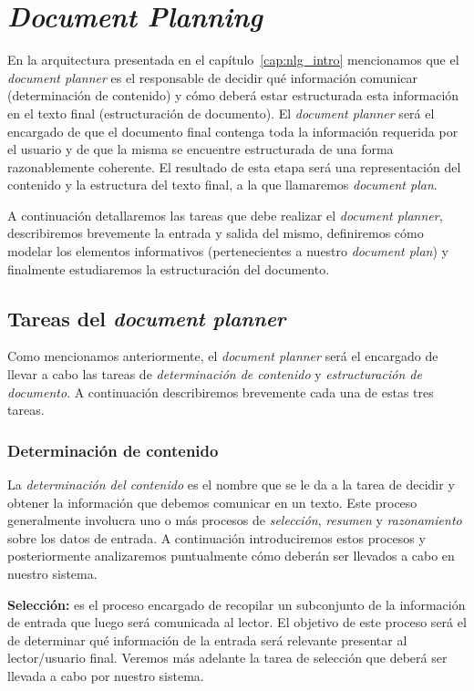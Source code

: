 \chapter{\textit{Document Planning}}
\label{cap:document_planning}

En la arquitectura presentada en el capítulo~\ref{cap:nlg_intro} mencionamos que el \emph{document planner} es el responsable de decidir qué información comunicar (determinación de contenido) y cómo deberá estar estructurada esta información en el texto final (estructuración de documento). El \textit{document planner} será el encargado de que el documento final contenga toda la información requerida por el usuario y de que la misma se encuentre estructurada de una forma razonablemente coherente. El resultado de esta etapa será una representación del contenido y la estructura del texto final, a la que llamaremos \emph{document plan}.

A continuación detallaremos las tareas que debe realizar el \textit{document planner}, describiremos brevemente la entrada y salida del mismo, definiremos cómo modelar los elementos informativos (pertenecientes a nuestro \emph{document plan}) y finalmente estudiaremos la estructuración del documento.

\section{Tareas del \textit{document planner}}
Como mencionamos anteriormente, el \textit{document planner} será el encargado de llevar a cabo las tareas de \emph{determinación de contenido} y \emph{estructuración de documento}. A continuación describiremos brevemente cada una de estas tres tareas.

\subsection*{Determinación de contenido}

La \emph{determinación del contenido} es el nombre que se le da a la tarea de decidir y obtener la información que debemos comunicar en un texto. Este proceso generalmente involucra uno o más procesos de \emph{selección}, \emph{resumen} y \emph{razonamiento} sobre los datos de entrada. A continuación introduciremos estos procesos y posteriormente analizaremos puntualmente cómo deberán ser llevados a cabo en nuestro sistema.

\bigskip
\noindent
\textbf{Selección:} es el proceso encargado de recopilar un subconjunto de la información de entrada que luego será comunicada al lector. El objetivo de este proceso será el de determinar qué información de la entrada será relevante presentar al lector/usuario final. Veremos más adelante la tarea de selección que deberá ser llevada a cabo por nuestro sistema.

